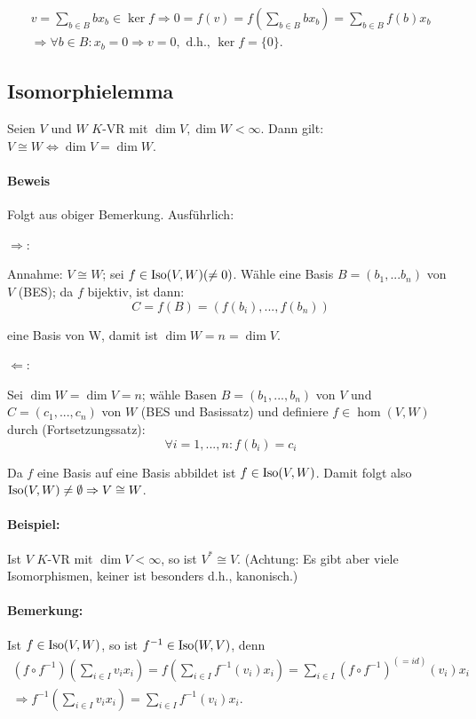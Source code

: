 	\begin{gather*}
		v = \sum_{b\in B} bx_b \in \ker f \Rightarrow 0 = f(v) = f(\sum_{b\in B}bx_b) = \sum_{b\in B}f(b)x_b\\
		\Rightarrow \forall b \in B: x_b = 0 \Rightarrow v = 0, \text{ d.h., } \ker f=\{{0}\}.
	\end{gather*}
			
\subsection{Isomorphielemma}
	\begin{Lemma}[Isomorphielemma]
		Seien $V$ und $W$ $ K $-VR mit $\dim V, \dim W < \infty$.
	Dann gilt: $V \cong W \Leftrightarrow \dim V = \dim W$.
	\end{Lemma}
	
\paragraph{Beweis}
	Folgt aus obiger Bemerkung. Ausführlich:
		
	$\Rightarrow$:
	
	Annahme: $V \cong W$; sei $f\in \operatorname{Iso}(V,W)(\neq 0)$.
	Wähle eine Basis $B = (b_1, ... b_n)$ von $V$ (BES); da $f$ bijektiv, ist dann:
	\begin{equation*}
		C = f(B) = (f(b_i), ... , f(b_n))
	\end{equation*}
	
	eine Basis von W, damit ist $\dim W = n = \dim V$.
	
	$\Leftarrow$:
	
	Sei $\dim W = \dim V = n$;
	wähle Basen $B = (b_1, ... ,b_n)$ von $V$ und $C = (c_1, ... ,c_n)$ von $W$ (BES und Basissatz) und definiere $f\in \hom(V,W)$ durch (Fortsetzungssatz):
	\begin{equation*}
		\forall i = 1, ... ,n : f(b_i) = c_i
	\end{equation*}

	Da $f$ eine Basis auf eine Basis abbildet ist $f\in \operatorname{Iso}(V,W)$.
	Damit folgt also $\operatorname{Iso}(V,W) \neq \emptyset \Rightarrow V \cong W$.
			
\paragraph{Beispiel: }
	Ist $V$ $K$-VR mit $\dim V < \infty$, so ist $V^\ast \cong V$. (Achtung: Es gibt aber viele Isomorphismen, keiner ist besonders d.h., \glqq kanonisch\grqq .)
	
\paragraph{Bemerkung: }
	Ist $f\in \operatorname{Iso}(V,W)$, so ist $f^{-1}\in \operatorname{Iso}(W,V)$, denn
	\begin{gather*}
		(f\circ f^{-1})(\sum_{i\in I}v_ix_i) = f(\sum_{i\in I}f^{-1}(v_i)x_i) = \sum_{i\in I}(f\circ f^{-1})^{(= id)}(v_i)x_i\\
		\Rightarrow f^{-1}(\sum_{i\in I}v_ix_i) = \sum_{i\in I}f^{-1}(v_i)x_i.
	\end{gather*}
